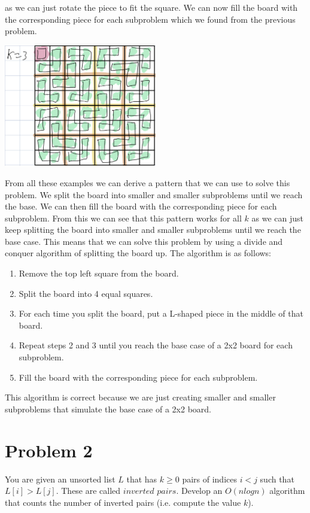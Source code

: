 \documentclass[12pt,letterpaper]{article}
\begin{document}
as we can just rotate the piece to fit the square. We can now fill the board with the corresponding
piece for each subproblem which we found from the previous problem.
\begin{center}
    \includegraphics[width=0.5\textwidth]{images/1.3.jpeg}
\end{center}
From all these examples we can derive a pattern that we can use to solve this problem. We split the board into smaller and smaller subproblems until we reach the base.
We can then fill the board with the corresponding piece for each subproblem. From this we can see that this
pattern works for all $k$ as we can just keep splitting the board into smaller and smaller subproblems
until we reach the base case. This means that we can solve this problem by using a divide and conquer
algorithm of splitting the board up. The algorithm is as follows:
\begin{enumerate}
    \item Remove the top left square from the board.
    \item Split the board into 4 equal squares.
    \item For each time you split the board, put a L-shaped piece in the middle of that board.
    \item Repeat steps 2 and 3 until you reach the base case of a 2x2 board for each subproblem.
    \item Fill the board with the corresponding piece for each subproblem.
\end{enumerate}
This algorithm is correct because we are just creating smaller and smaller subproblems that 
simulate the base case of a 2x2 board.

\pagebreak

\section*{Problem 2}

You are given an unsorted list $L$ that has $k \ge 0$ pairs of indices $i < j$ such that $L[i] > L[j]$.
These are called $inverted$ $pairs$. Develop an $O(n log n)$ algorithm that counts the number of
inverted pairs (i.e. compute the value $k$).
\end{document}
